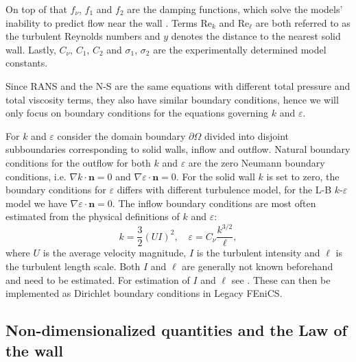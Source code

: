 On top of that \(f_\nu\), \(f_1\) and \(f_2\) are the damping functions, which solve the models' inability to predict flow near the wall \citep{greenshields_notes_2022}. Terms \(\text{Re}_k\) and \(\text{Re}_\ell\) are both referred to as the turbulent Reynolds numbers and \(y\) denotes the distance to the nearest solid wall. Lastly, \(C_\nu\), \(C_1\), \(C_2\) and \(\sigma_1\), \(\sigma_2\) are the experimentally determined model constants.

Since RANS and the N-S are the same equations with different total pressure and total viscosity terms, they also have similar boundary conditions, hence we will only focus on boundary conditions for the equations governing \(k\) and \(\varepsilon\).

For \(k\) and \(\varepsilon\) consider the domain boundary \(\partial \Omega\) divided into disjoint subboundaries corresponding to solid walls, inflow and outflow. Natural boundary conditions for the outflow for both \(k\) and \(\varepsilon\) are the zero Neumann boundary conditions, i.e. \(\nabla k \cdot \mathbf{n} = 0\) and \(\nabla \varepsilon \cdot \mathbf{n} = 0\). For the solid wall \(k\) is set to zero, the boundary conditions for \(\varepsilon\) differs with different turbulence model, for the L-B \(k\)-\(\varepsilon\) model we have \(\nabla \varepsilon \cdot \mathbf{n} = 0\). The inflow boundary conditions are most often estimated from the physical definitions of \(k\) and \(\varepsilon\):
\begin{equation*}\label{eq: definitions of k-e}
    k = \frac{3}{2} (U I)^2, 
    \quad
    \varepsilon = C_\nu \frac{k^{3/2}}{\ell},
\end{equation*}
where \(U\) is the average velocity magnitude, \(I\) is the turbulent intensity and \(\ell\) is the turbulent length scale. Both \(I\) and \(\ell\) are generally not known beforehand and need to be estimated. For estimation of \(I\) and \(\ell\) see \cite{greenshields_notes_2022}. These can then be implemented as Dirichlet boundary conditions in Legacy FEniCS.

\subsection{Non-dimensionalized quantities and the Law of the wall}

